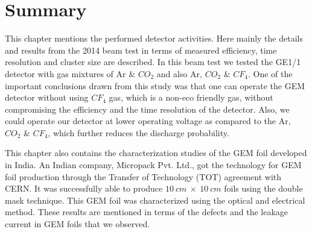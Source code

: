 

\section{Summary} %
\label{sec:summary}
This chapter mentions the performed detector activities. Here mainly the details and results from the 2014 beam test in terms of measured efficiency, time resolution and cluster size are described. In this beam test we tested the GE1/1 detector with gas mixtures of Ar \& $CO_2$ and also Ar, $CO_2$ \& $CF_4$. One of the important conclusions drawn from this study was that one can operate the GEM detector without using $CF_4$ gas, which is a non-eco friendly gas, without compromising the efficiency and the time resolution of the detector. Also, we could operate our detector at lower operating voltage as compared to the Ar, $CO_2$ \& $CF_4$, which further reduces the discharge probability.

This chapter also contains the characterization studies of the GEM foil developed in India. An Indian company, Micropack Pvt. Ltd., got the technology for GEM foil production through the Transfer of Technology (TOT) agreement with CERN. It was successfully able to produce $10~cm~\times~10~cm$ foils using the double mask technique. This GEM foil was characterized using the optical and electrical method. These results are mentioned in terms of the defects and the leakage current in GEM foils that we observed.

